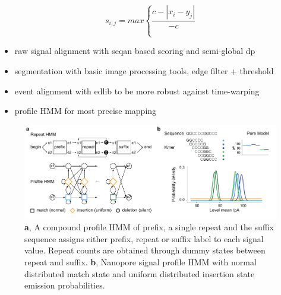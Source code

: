 \begin{equation}
    s_{i,j} = max \left\lbrace \frac{c - \left| x_{i} - y_{j} \right| }{-c} \right.
\end{equation}




\begin{itemize}
	\item raw signal alignment with seqan based scoring and semi-global dp
	\item segmentation with basic image processing tools, edge filter + threshold
	\item event alignment with edlib to be more robust against time-warping
	\item profile HMM for most precise mapping
\end{itemize}

\cite{Schreiber2015}

\begin{figure}[h]
	\centering
	\includegraphics[width=1.0\textwidth]{figures/signal/count_hmm.pdf}
	\captionsetup{format=plain}
	\caption[Nanopore signal processing with STRique]{\textbf{a}, A compound profile HMM of prefix, a single repeat and the suffix sequence assigns either prefix, repeat or suffix label to each signal value. Repeat counts are obtained through dummy states between repeat and suffix. \textbf{b}, Nanopore signal profile HMM with normal distributed match state and uniform distributed insertion state emission probabilities.}
	\label{fig:strique:count_hmm}
\end{figure}